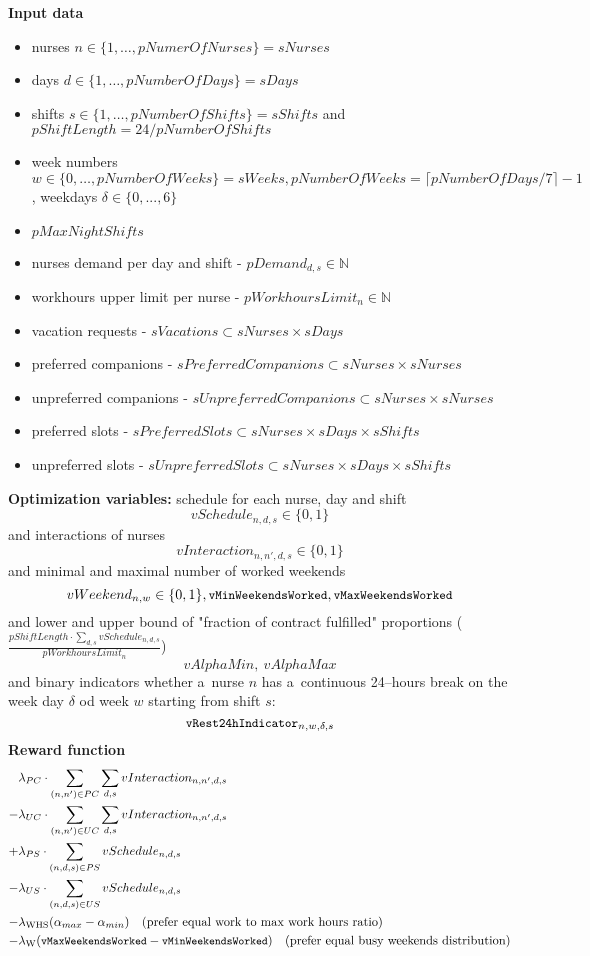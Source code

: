 \documentclass{article}
\newcommand{\N}{\mathbb{N}}
\newcommand{\varMinWeekendsWorked}{\texttt{\small vMinWeekendsWorked}}
\newcommand{\varMaxWeekendsWorked}{\texttt{\small vMaxWeekendsWorked}}
\newcommand{\varDayLengthBreakIndicator}[4]{\texttt{\small vRest24hIndicator}_{#1, #2, #3, #4}}
\begin{document}
\noindent \textbf{Input data}
\begin{itemize}
    \item nurses $n\in \{1, \dots, pNumerOfNurses\} = sNurses$
    \item days $d\in \{1, \dots, pNumberOfDays\} = sDays$
    \item shifts $s\in \{1, \dots, pNumberOfShifts\} = sShifts$ and $pShiftLength = 24/pNumberOfShifts$
    \item week numbers $w\in\{0, \dots, pNumberOfWeeks\} = sWeeks, pNumberOfWeeks=\lceil pNumberOfDays/7 \rceil - 1$, weekdays $\delta \in \{0, ..., 6\}$
    \item $pMaxNightShifts$
    \item nurses demand per day and shift - $pDemand_{d,s} \in \N$
    \item workhours upper limit per nurse - $pWorkhoursLimit_n \in \N$
    \item vacation requests - $sVacations \subset sNurses \times sDays$
    \item preferred companions - $sPreferredCompanions \subset sNurses \times sNurses$
    \item unpreferred companions - $sUnpreferredCompanions \subset sNurses \times sNurses$
    \item preferred slots - $sPreferredSlots \subset sNurses \times sDays \times sShifts$
    \item unpreferred slots - $sUnpreferredSlots \subset sNurses \times sDays \times sShifts$
\end{itemize}
\textbf{Optimization variables:} schedule for each nurse, day and shift 
$$vSchedule_{n,d,s} \in \{0,1\}$$
and interactions of nurses
$$vInteraction_{n,n',d,s} \in \{0,1\}$$
and minimal and maximal number of worked weekends
$$vWeekend_{n, w} \in \{0, 1\}, \varMinWeekendsWorked, \varMaxWeekendsWorked$$
and lower and upper bound of "fraction of contract fulfilled" proportions ($\frac{pShiftLength\cdot\sum_{d,s}vSchedule_{n,d,s}}{pWorkhoursLimit_n}$)
$$vAlphaMin,\ vAlphaMax$$
and binary indicators whether a~nurse $n$ has a~continuous 24--hours break on the week day $\delta$ od week $w$ starting from shift $s$:
$$\varDayLengthBreakIndicator{n}{w}{\delta}{s}$$
\textbf{Reward function}
\begin{align*}
     &\lambda_{PC}\cdot\sum_{(n, n')\in PC}\sum_{d,s} vInteraction_{n,n',d,s} \\
    -&\lambda_{UC}\cdot\sum_{(n, n')\in UC}\sum_{d,s} vInteraction_{n,n',d,s} \\ 
    +&\lambda_{PS}\cdot\sum_{(n, d, s)\in PS} vSchedule_{n,d,s} \\ 
    -&\lambda_{US}\cdot\sum_{(n, d, s)\in US} vSchedule_{n,d,s} \\
    - &\lambda_\text{WHS} (\alpha_{max} - \alpha_{min})\quad \text{(prefer equal work to max work hours ratio)} \\
    - &\lambda_\text{W} (\varMaxWeekendsWorked - \varMinWeekendsWorked)\quad \text{(prefer equal busy weekends distribution)}
\end{align*}
\end{document}
